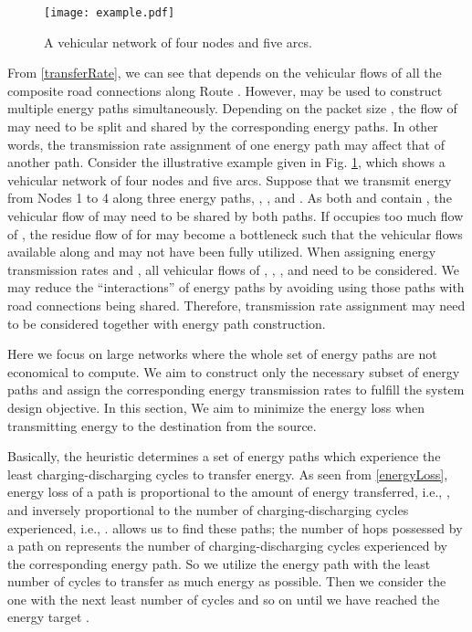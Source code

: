 \documentclass[journal]{IEEEtran}
\begin{document}
\begin{figure}[!t]
\centering
\texttt{[image: example.pdf]}
\caption{A vehicular network of four nodes and five arcs.}
\label{fig:example}
\end{figure}

From \eqref{transferRate}, we can see that  depends on the vehicular flows  of all the composite road connections  along Route . However,  may be used to construct multiple energy paths simultaneously. Depending on the packet size , the flow of  may need to be split and shared by the corresponding energy paths. In other words, the transmission rate assignment of one energy path may affect that of another path. 
Consider the illustrative example given in Fig. \ref{fig:example}, which shows a vehicular network of four nodes and five arcs. Suppose that we transmit energy from Nodes 1 to 4 along three energy paths, , , and . As both  and  contain , the vehicular flow of  may need to be shared by both paths. If  occupies too much flow of , the residue flow of  for  may become a bottleneck such that the vehicular flows available along  and  may not have been fully utilized. When assigning energy transmission rates  and , all vehicular flows of , , , and  need to be considered.
We may reduce the ``interactions'' of energy paths by avoiding using those paths with road connections being shared. Therefore,  transmission rate assignment may need to be considered together with energy path construction. 




Here we focus on large networks where the whole set of energy paths are not economical to compute. We aim to construct only the necessary subset of energy paths and assign the corresponding energy transmission rates to fulfill the system design objective. 
In this section, We aim to minimize the energy loss when transmitting energy to the destination from the source. 


Basically, the heuristic determines a set of energy paths which experience the least charging-discharging cycles to transfer energy. As seen from \eqref{energyLoss}, energy loss of a path is proportional to the amount of energy transferred, i.e., , and inversely proportional to the number of  charging-discharging cycles experienced, i.e., .  allows us to find these paths; the number of hops possessed by a path on   represents the number of charging-discharging cycles experienced by the corresponding energy path. So we utilize the energy path with the least number of cycles to transfer as much energy as possible. Then we consider  the one with the next least number of cycles and so on until we have reached the energy target .
\end{document}
